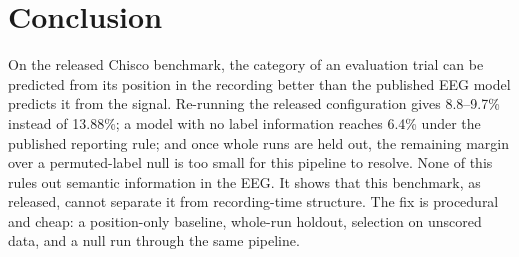\section{Conclusion}
\label{sec:conclusion}

On the released Chisco benchmark, the category of an evaluation trial can be predicted from its
position in the recording better than the published EEG model predicts it from the signal. Re-running
the released configuration gives 8.8--9.7\% instead of 13.88\%; a model with no label information
reaches 6.4\% under the published reporting rule; and once whole runs are held out, the remaining
margin over a permuted-label null is too small for this pipeline to resolve. None of this rules out
semantic information in the EEG. It shows that this benchmark, as released, cannot separate it from recording-time structure. The fix
is procedural and cheap: a position-only baseline, whole-run holdout, selection on unscored data, and
a null run through the same pipeline.
